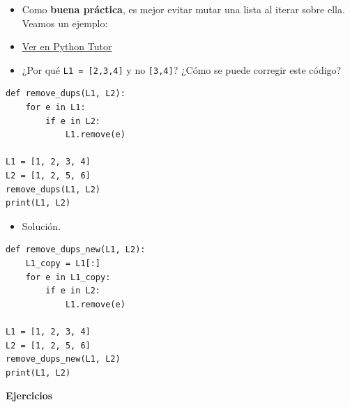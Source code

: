 \documentclass[mathserif]{beamer}
\begin{document}
\begin{frame}[fragile]{}
    \begin{itemize}
        \item Como {\blue\bfseries buena práctica}, es mejor evitar mutar una lista al iterar sobre ella. Veamos un ejemplo: 
        
        \item \href{http://pythontutor.com/visualize.html#code=def%20remove_dups%28L1,%20L2%29%3A%0A%20%20%20%20for%20e%20in%20L1%3A%0A%20%20%20%20%20%20%20%20if%20e%20in%20L2%3A%0A%20%20%20%20%20%20%20%20%20%20%20%20L1.remove%28e%29%0A%0AL1%20%3D%20%5B1,%202,%203,%204%5D%0AL2%20%3D%20%5B1,%202,%205,%206%5D%0Aremove_dups%28L1,%20L2%29%0Aprint%28L1,%20L2%29&cumulative=false&curInstr=15&heapPrimitives=nevernest&mode=display&origin=opt-frontend.js&py=3&rawInputLstJSON=%5B%5D&textReferences=false}{Ver en Python Tutor}
        
        \item ¿Por qué \lstinline|L1 = [2,3,4]| y no \lstinline|[3,4]|? ¿Cómo se puede corregir este código?
    \end{itemize}
\begin{lstlisting}
def remove_dups(L1, L2):
    for e in L1:
        if e in L2:
            L1.remove(e)

L1 = [1, 2, 3, 4]
L2 = [1, 2, 5, 6]
remove_dups(L1, L2)
print(L1, L2)
\end{lstlisting}
\end{frame}

\begin{frame}[fragile]{}
    \begin{itemize}
        \item Solución.
    \end{itemize}
\begin{lstlisting}
def remove_dups_new(L1, L2):
    L1_copy = L1[:]
    for e in L1_copy:
        if e in L2:
            L1.remove(e)
            
L1 = [1, 2, 3, 4]
L2 = [1, 2, 5, 6]
remove_dups_new(L1, L2)
print(L1, L2)

\end{lstlisting}
\end{frame}

\begin{frame}{}
\centering
{\bfseries\blue\LARGE Ejercicios}
\end{frame}

\end{document}
